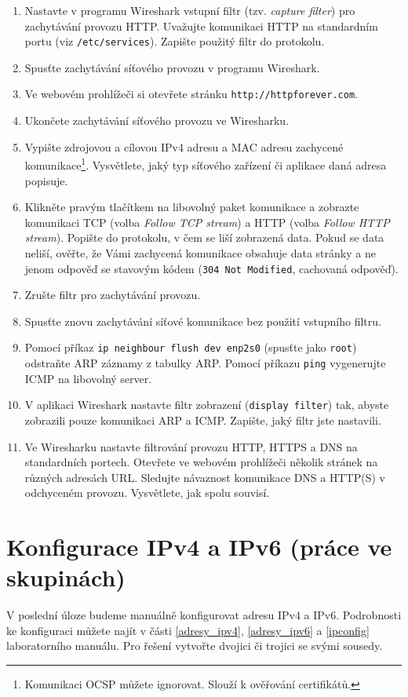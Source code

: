 \documentclass[a4paper,11pt]{article}
\begin{document}
\begin{enumerate}
  \item Nastavte v programu Wireshark vstupní filtr (tzv. {\em capture filter}) pro zachytávání provozu HTTP. Uvažujte komunikaci HTTP na standardním portu (viz {\tt /etc/services}). Zapište použitý filtr do protokolu.
  \item Spusťte zachytávání síťového provozu v programu Wireshark.
  \item Ve webovém prohlížeči si otevřete stránku \texttt{http://httpforever.com}.
  \item Ukončete zachytávání síťového provozu ve Wiresharku. 
  \item Vypište zdrojovou a cílovou IPv4 adresu a MAC adresu zachycené komunikace\footnote{Komunikaci OCSP můžete ignorovat. Slouží k ověřování certifikátů.}. Vysvětlete, jaký typ síťového zařízení či aplikace daná adresa popisuje.
  \item Klikněte pravým tlačítkem na libovolný paket komunikace a zobrazte komunikaci TCP (volba {\em Follow TCP stream}) a HTTP (volba {\em Follow HTTP stream}). Popište do protokolu, v čem se liší zobrazená data. Pokud se data neliší, ověřte, že Vámi zachycená komunikace obsahuje data stránky a ne jenom odpověď se stavovým kódem (\texttt{304 Not Modified}, cachovaná odpověď).
  \item Zrušte filtr pro zachytávání provozu.
  \item Spusťte znovu zachytávání síťové komunikace bez použití vstupního filtru.
  \item Pomocí příkaz \texttt{ip neighbour flush dev enp2s0} (spusťte jako {\tt root}) odstraňte ARP záznamy z tabulky ARP. Pomocí příkazu {\tt ping} vygenerujte ICMP na libovolný server.
  \item V aplikaci Wireshark nastavte filtr zobrazení ({\tt display filter}) tak, abyste zobrazili pouze komunikaci ARP a ICMP. Zapište, jaký filtr jste nastavili.
  \item Ve Wiresharku nastavte filtrování provozu HTTP, HTTPS a DNS na standardních portech. Otevřete ve webovém prohlížeči několik stránek na různých adresách URL. Sledujte návaznost komunikace DNS a HTTP(S) v odchyceném provozu. Vysvětlete, jak spolu souvisí. 
\end{enumerate}

\section{Konfigurace IPv4 a IPv6 (práce ve skupinách)}
V poslední úloze budeme manuálně konfigurovat adresu IPv4 a IPv6. Podrobnosti ke konfiguraci můžete najít v části \ref{adresy_ipv4}, \ref{adresy_ipv6} a \ref{ipconfig} laboratorního manuálu. Pro řešení vytvořte dvojici či trojici se svými sousedy.
\end{document}
